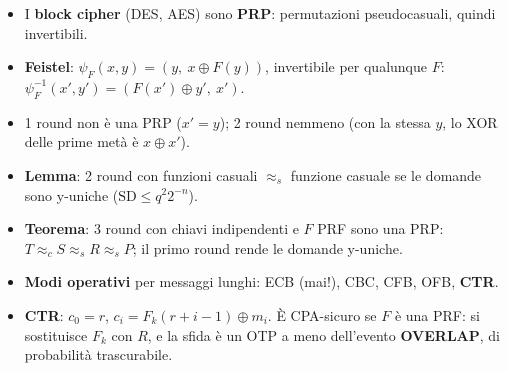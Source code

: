 \begin{itemize}
  \item I \textbf{block cipher} (DES, AES) sono \textbf{PRP}: permutazioni pseudocasuali, quindi invertibili.
  \item \textbf{Feistel}: \(\psi_F(x, y) = (y,\ x \oplus F(y))\), invertibile per qualunque \(F\): \(\psi_F^{-1}(x', y') = (F(x') \oplus y',\ x')\).
  \item 1 round non è una PRP (\(x' = y\)); 2 round nemmeno (con la stessa \(y\), lo XOR delle prime metà è \(x \oplus x'\)).
  \item \textbf{Lemma}: 2 round con funzioni casuali \(\approx_s\) funzione casuale se le domande sono y-uniche (\(\text{SD} \le q^2 2^{-n}\)).
  \item \textbf{Teorema}: 3 round con chiavi indipendenti e \(F\) PRF sono una PRP: \(T \approx_c S \approx_s R \approx_s P\); il primo round rende le domande y-uniche.
  \item \textbf{Modi operativi} per messaggi lunghi: ECB (mai!), CBC, CFB, OFB, \textbf{CTR}.
  \item \textbf{CTR}: \(c_0 = r\), \(c_i = F_k(r + i - 1) \oplus m_i\). È CPA-sicuro se \(F\) è una PRF: si sostituisce \(F_k\) con \(R\), e la sfida è un OTP a meno dell'evento \textbf{OVERLAP}, di probabilità trascurabile.
\end{itemize}
